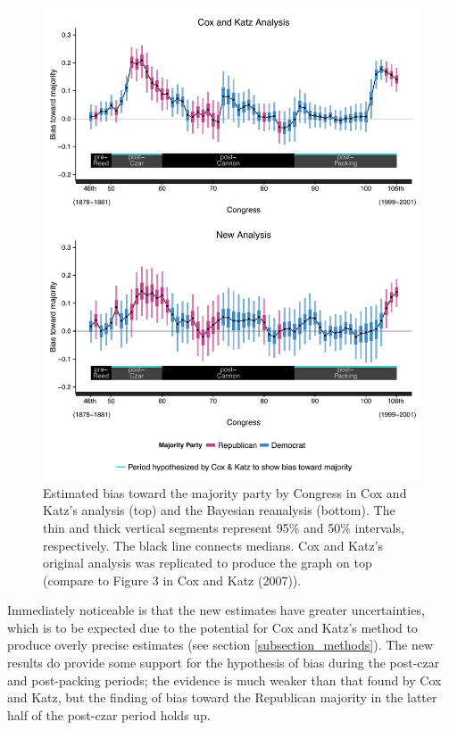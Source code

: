 \begin{figure}
\centering
\includegraphics[scale=0.75]{sections/figs/ck_replication_new}
\caption{Estimated bias toward the majority party by Congress in 
Cox and Katz's analysis (top) and the Bayesian reanalysis (bottom). 
The thin and thick vertical segments represent 95\%  and 50\%
intervals, respectively.  The black line connects medians.
Cox and Katz's original analysis was replicated to produce the graph on top 
(compare to Figure 3 in Cox and Katz (2007)).}
\label{fig:ck_bias}
\end{figure}

Immediately noticeable is that the new estimates have greater 
uncertainties, which is to be expected due to the potential for Cox and Katz's method to 
produce overly precise estimates  (see section \ref{subsection_methods}). The new results 
do provide some support for the hypothesis of bias during the post-czar and post-packing 
periods; the evidence is much weaker than that found by Cox and Katz, but the finding 
of bias toward the Republican majority in the latter half of the post-czar period holds up. 

